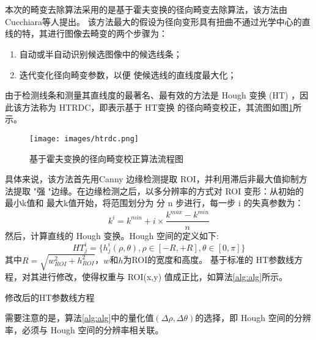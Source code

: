 \documentclass[12pt, onecolumn]{article}
\newcommand\normf{\fangsong}
\begin{document}
	\section{\normf{基于霍夫变换的径向畸变校正}}
	本次的畸变去除算法采用的是基于霍夫变换的径向畸变去除算法，该方法由Cucchiara等人\cite{cucchiara2003hough}提出。
	该方法最大的假设为径向变形具有扭曲不通过光学中心的直线的特，其进行图像去畸变的两个步骤为：
	\begin{enumerate}
	\item 自动或半自动识别候选图像中的候选线条；
	
	\item 迭代变化径向畸变参数，以便
		使候选线的直线度最大化；
	\end{enumerate}
	由于检测线条和测量其直线度的最著名、最有效的方法是 Hough 变换 (HT) \cite{illingworth1988survey}，因此该方法称为 HTRDC，即表示基于 HT变换 的径向畸变校正，其流图如图\ref{fig:htrdc}所示。
	
	\begin{figure}[h]
		\centering
		\texttt{[image: images/htrdc.png]}
		\caption{\normf 基于霍夫变换的径向畸变校正算法流程图}
		\label{fig:htrdc}
	\end{figure}
	
	具体来说，该方法首先用Canny 边缘检测\cite{canny1986computational}提取 ROI，并利用滞后非最大值抑制方法提取 "强 "边缘。在边缘检测之后，以多分辨率的方式对 ROI
	变形：从初始的 最小k值和 最大k值开始，将范围划分为 分 n 步进行，每一步 i 的失真参数为：
	\begin{equation}
	k^i=k^{min}+i\times\frac{k^{max}-k^{min}}{n}
	\end{equation}
	然后，计算直线的 Hough 变换。Hough 空间的定义如下:
	\begin{equation}
	HT^i_j=\{h^i_j(\rho,\theta),\rho\in\left[ -R,+R\right],\theta\in\left[ 0,\pi\right]  \}
	\end{equation}
	其中$R=\sqrt{w^2_{ROI}+h^2_{ROI}}$，$w$和$h$为ROI的宽度和高度。
	基于标准的 HT参数线方程，对其进行修改，使得权重与 ROI(x,y) 值成正比，如算法\ref{alg:alg}所示。
	\begin{algorithm}
	\caption{\normf 修改后的HT参数线方程}
	\label{alg:alg}
	\end{algorithm}
	需要注意的是，算法\ref{alg:alg}中的量化值$(\Delta \rho,\Delta\theta)$的选择，即 Hough 空间的分辨率，必须与 Hough 空间的分辨率相关联。
	
\end{document}
